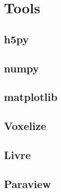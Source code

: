 \chapter{Tools}

\section{h5py}
\section{numpy}
\section{matplotlib}
\section{Voxelize}
\section{Livre}
\section{Paraview}

